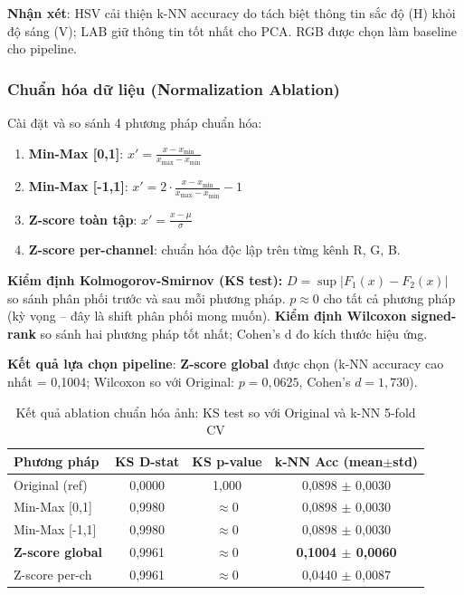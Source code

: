 \documentclass[12pt,a4paper]{article}
\let\oldtextbf\textbf
\renewcommand{\textbf}[1]{\oldtextbf{\textcolor{hcmublue}{#1}}}
\begin{document}
\textbf{Nhận xét}: HSV cải thiện k-NN accuracy do tách biệt thông tin sắc độ (H) khỏi độ sáng (V); LAB giữ thông tin tốt nhất cho PCA. RGB được chọn làm baseline cho pipeline.

\subsubsection{Chuẩn hóa dữ liệu (Normalization Ablation)}

Cài đặt và so sánh 4 phương pháp chuẩn hóa:
\begin{enumerate}
    \item \textbf{Min-Max [0,1]}: $x' = \frac{x - x_{\min}}{x_{\max} - x_{\min}}$
    \item \textbf{Min-Max [-1,1]}: $x' = 2\cdot\frac{x - x_{\min}}{x_{\max} - x_{\min}} - 1$
    \item \textbf{Z-score toàn tập}: $x' = \frac{x - \mu}{\sigma}$
    \item \textbf{Z-score per-channel}: chuẩn hóa độc lập trên từng kênh R, G, B.
\end{enumerate}

\textbf{Kiểm định Kolmogorov-Smirnov (KS test):} $D = \sup|F_1(x) - F_2(x)|$ so sánh phân phối trước và sau mỗi phương pháp. $p \approx 0$ cho tất cả phương pháp (kỳ vọng -- đây là shift phân phối mong muốn). \textbf{Kiểm định Wilcoxon signed-rank} so sánh hai phương pháp tốt nhất; Cohen's d đo kích thước hiệu ứng.

\textbf{Kết quả lựa chọn pipeline}: \textbf{Z-score global} được chọn (k-NN accuracy cao nhất = 0{,}1004; Wilcoxon so với Original: $p = 0{,}0625$, Cohen's $d = 1{,}730$).

\begin{table}[H]
\centering
\small
\begin{tabular}{|l|c|c|c|}
\hline
\textbf{Phương pháp} & \textbf{KS D-stat} & \textbf{KS p-value} & \textbf{k-NN Acc (mean$\pm$std)} \\ \hline
Original (ref)              & 0{,}0000 & 1{,}000       & 0{,}0898 $\pm$ 0{,}0030 \\ \hline
Min-Max {[}0,1{]}           & 0{,}9980 & $\approx 0$   & 0{,}0898 $\pm$ 0{,}0030 \\ \hline
Min-Max {[}-1,1{]}          & 0{,}9980 & $\approx 0$   & 0{,}0898 $\pm$ 0{,}0030 \\ \hline
\textbf{Z-score global}     & 0{,}9961 & $\approx 0$   & \textbf{0{,}1004 $\pm$ 0{,}0060} \\ \hline
Z-score per-ch              & 0{,}9961 & $\approx 0$   & 0{,}0440 $\pm$ 0{,}0087 \\ \hline
\end{tabular}
\caption{Kết quả ablation chuẩn hóa ảnh: KS test so với Original và k-NN 5-fold CV}
\label{tab:norm_ablation}
\end{table}
\end{document}
